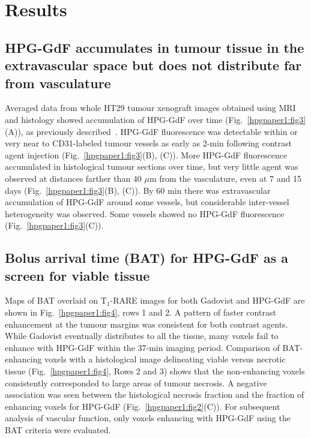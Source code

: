 \section{Results}

\subsection{HPG-GdF accumulates in tumour tissue in the extravascular space but does not distribute far from vasculature}

Averaged data from whole HT29 tumour xenograft images obtained using MRI and histology showed accumulation of \acs{HPG-GdF} over time (Fig.~\ref{hpgpaper1:fig3}(A)), as previously described~\cite{Saatchi:2012hc}.
\acs{HPG-GdF} fluorescence was detectable within or very near to \acs{CD31}-labeled tumour vessels as early as 2-min following contrast agent injection (Fig.~\ref{hpgpaper1:fig3}(B), (C)).
More \acs{HPG-GdF} fluorescence accumulated in histological tumour sections over time, but very little agent was observed at distances farther than 40 $\mu$m from the vasculature, even at 7 and 15 days (Fig.~\ref{hpgpaper1:fig3}(B), (C)).
By 60 min there was extravascular accumulation of \acs{HPG-GdF} around some vessels, but considerable inter-vessel heterogeneity was observed.
Some vessels showed no \acs{HPG-GdF} fluorescence (Fig.~\ref{hpgpaper1:fig3}(C)). 

\subsection{Bolus arrival time (BAT) for \acs{HPG-GdF} as a screen for viable tissue}

Maps of \acs{BAT} overlaid on T$_1$-RARE images for both Gadovist and \acs{HPG-GdF} are shown in Fig.~\ref{hpgpaper1:fig4}, rows 1 and 2.
A pattern of faster contrast enhancement at the tumour margins was consistent for both contrast agents.
While Gadovist eventually distributes to all the tissue, many voxels fail to enhance with \acs{HPG-GdF} within the 37-min imaging period.
Comparison of \acs{BAT}-enhancing voxels with a histological image delineating viable versus necrotic tissue (Fig.~\ref{hpgpaper1:fig4}, Rows 2 and 3) shows that the non-enhancing voxels consistently corresponded to large areas of tumour necrosis.
A negative association was seen between the histological necrosis fraction and the fraction of enhancing voxels for \acs{HPG-GdF} (Fig.~\ref{hpgpaper1:fig2}(C)).
For subsequent analysis of vascular function, only voxels enhancing with \acs{HPG-GdF} using the \acs{BAT} criteria were evaluated.

